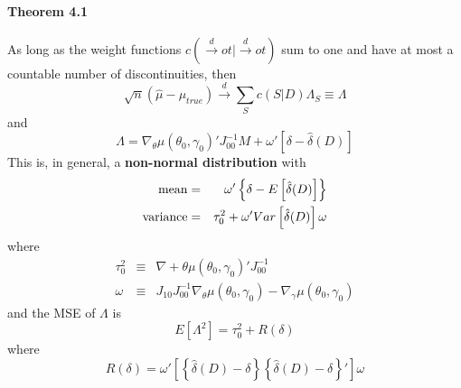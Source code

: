 \documentclass[12pt]{article}
\theoremstyle{definition}
\begin{document}
\paragraph{Theorem 4.1} As long as the weight functions $c(\overset{d}{\rightarrow}ot|\overset{d}{\rightarrow}ot)$ sum to one and have at most a countable number of discontinuities, then
	$$
	\sqrt{n} \left(\hat{\mu} - \mu_{true}  \right) \overset{d}{\rightarrow} \sum_S c(S|D) \Lambda_S \equiv \Lambda
$$
and
	$$
\Lambda = \nabla_\theta \mu(\theta_0,\gamma_0)' J_{00}^{-1} M + \omega' \left[\delta - \hat{\delta}(D) \right] 
$$
This is, in general, a \textbf{non-normal distribution} with
	\begin{eqnarray*}
		\hbox{mean} &=& \omega' \left\{ \delta - E\left[  \hat{\delta}(D) \right] \right\}\\
		\hbox{variance} &=& \tau_0^2 + \omega'Var\left[\hat{\delta}(D)\right]\omega
	\end{eqnarray*}
where
	\begin{eqnarray*}
	\tau_0^2 &\equiv& \nabla+\theta \mu(\theta_0, \gamma_0)' J_{00}^{-1}\\
	\omega &\equiv& J_{10}J_{00}^{-1}\nabla_\theta \mu(\theta_0, \gamma_0) - \nabla_\gamma \mu(\theta_0, \gamma_0)
\end{eqnarray*}
and the MSE of $\Lambda$ is
	$$
	E[\Lambda^2] = \tau_0^2 + R(\delta)
$$
where
	$$R(\delta) = \omega' \left[ \left\{ \hat{\delta}(D) - \delta \right\}  \left\{ \hat{\delta}(D) - \delta \right\}  ' \right]\omega$$
\end{document}
